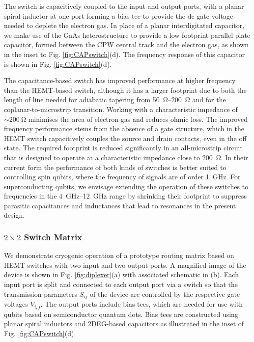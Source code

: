The switch is capacitively coupled to the input and output ports, with a planar spiral inductor at one port forming a bias tee to provide the dc gate voltage needed to deplete the electron gas. In place of a planar interdigitated capacitor, we make use of the GaAs heterostructure to provide a low footprint parallel plate capacitor, formed between the CPW central track and the electron gas, as shown in the inset to Fig. \ref{fig:CAPswitch}(d). The frequency response of this capacitor is shown in Fig. \ref{fig:CAPswitch}(d).

The capacitance-based switch has improved performance at higher frequency than the HEMT-based switch, although it has a larger footprint due to both the length of line needed for adiabatic tapering from \SIrange{50}{200}{\ohm} and for the coplanar-to-microstrip transition. Working with a characteristic impedance of $\sim \SI{200}{\ohm}$ minimises the area of electron gas and reduces ohmic loss. The improved frequency performance stems from the absence of a gate structure, which in the HEMT switch capacitively couples the source and drain contacts, even in the off state. The required footprint is reduced significantly in an all-microstrip circuit that is designed to operate at a characteristic impedance close to \SI{200}{\ohm}. In their current form the performance of both kinds of switches is better suited to controlling spin qubits, where the frequency of signals are of order \SI{1}{\giga\hertz}. For superconducting qubits, we envisage extending the operation of these switches to frequencies in the \SIrange{4}{12}{\giga\hertz} range by shrinking their footprint to suppress parasitic capacitances and inductances that lead to resonances in the present design.

\subsubsection{\texorpdfstring{$2\times2$}{2 × 2} Switch Matrix}
We demonstrate cryogenic operation of a prototype routing matrix based on HEMT switches with two input and two output ports. A magnified image of the device is shown in Fig. \ref{fig:diplexer}(a) with associated schematic in (b). Each input port is split and connected to each output port via a switch so that the transmission parameters $S_{ij}$ of the device are controlled by the respective gate voltages $V_{i,j}$. The output ports include bias tees, which are needed for use with qubits based on semiconductor quantum dots.  Bias tees are constructed using planar spiral inductors and 2DEG-based capacitors as illustrated in the inset of Fig. \ref{fig:CAPswitch}(d).


